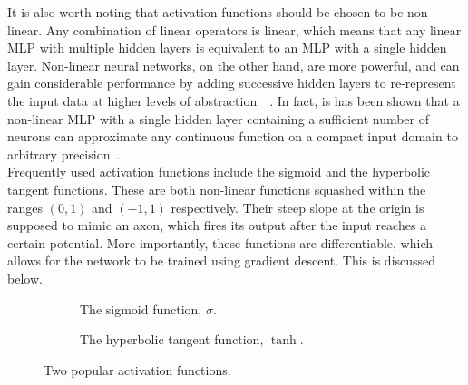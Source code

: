 \documentclass[a4paper, 12pt]{report}
\begin{document}
It is also worth noting that activation functions should be chosen to be non-linear. Any combination of linear operators is linear, which means that any linear MLP with multiple hidden layers is equivalent to an MLP with a single hidden layer. Non-linear neural networks, on the other hand, are more powerful, and can gain considerable performance by adding successive hidden layers to re-represent the input data at higher levels of abstraction~\cite{dbn:hinton2006}~\cite{scaling:bengio2007}. In fact, is has been shown that a non-linear MLP with a single hidden layer containing a sufficient number of neurons can approximate any continuous function on a compact input domain to arbitrary precision~\cite{universal_approximators:hornik1989}. \\

Frequently used activation functions include the sigmoid and the hyperbolic tangent functions. These are both non-linear functions squashed within the ranges $(0, 1)$ and $(-1, 1)$ respectively. Their steep slope at the origin is supposed to mimic an axon, which fires its output after the input reaches a certain potential. More importantly, these functions are differentiable, which allows for the network to be trained using gradient descent. This is discussed below. \\

\begin{figure}[h]
\captionsetup{justification=centering}
\centering
\begin{subfigure}{0.5\linewidth}
	\centering
	\caption{The sigmoid function, $\sigma$.}
\end{subfigure}%
\begin{subfigure}{0.5\linewidth}
	\centering
	\caption{The hyperbolic tangent function, $\tanh$.}
\end{subfigure}
\caption{Two popular activation functions.}
\end{figure}
\end{document}
